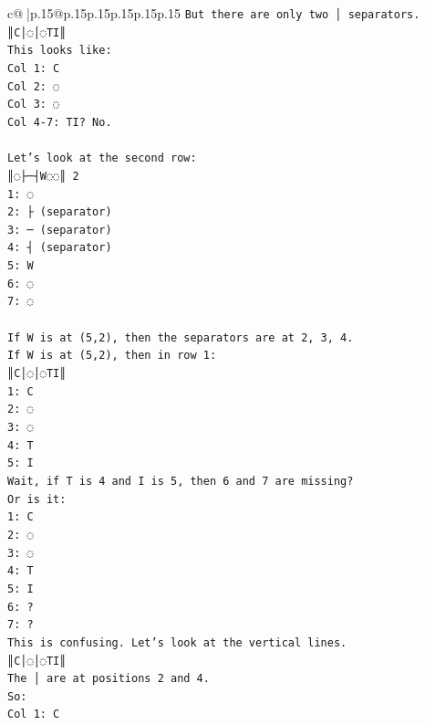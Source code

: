 \documentclass{article}
\begin{document}
{\begin{supertabular}{c@{$\;$}|p{.15\linewidth}@{}p{.15\linewidth}p{.15\linewidth}p{.15\linewidth}p{.15\linewidth}p{.15\linewidth}}
{{{\texttt{But there are only two │ separators.} \\
\texttt{║C│◌│◌TI║} \\
\texttt{This looks like:} \\
\texttt{Col 1: C} \\
\texttt{Col 2: ◌} \\
\texttt{Col 3: ◌} \\
\texttt{Col 4{-}7: TI? No.} \\
\\ 
\texttt{Let's look at the second row:} \\
\texttt{║◌├─┤W◌◌║ 2} \\
\texttt{1: ◌} \\
\texttt{2: ├ (separator)} \\
\texttt{3: ─ (separator)} \\
\texttt{4: ┤ (separator)} \\
\texttt{5: W} \\
\texttt{6: ◌} \\
\texttt{7: ◌} \\
\\ 
\texttt{If W is at (5,2), then the separators are at 2, 3, 4.} \\
\texttt{If W is at (5,2), then in row 1:} \\
\texttt{║C│◌│◌TI║} \\
\texttt{1: C} \\
\texttt{2: ◌} \\
\texttt{3: ◌} \\
\texttt{4: T} \\
\texttt{5: I} \\
\texttt{Wait, if T is 4 and I is 5, then 6 and 7 are missing?} \\
\texttt{Or is it:} \\
\texttt{1: C} \\
\texttt{2: ◌} \\
\texttt{3: ◌} \\
\texttt{4: T} \\
\texttt{5: I} \\
\texttt{6: ?} \\
\texttt{7: ?} \\
\texttt{This is confusing. Let's look at the vertical lines.} \\
\texttt{║C│◌│◌TI║} \\
\texttt{The │ are at positions 2 and 4.} \\
\texttt{So:} \\
\texttt{Col 1: C} \\
}}}
\end{supertabular}}
\end{document}

